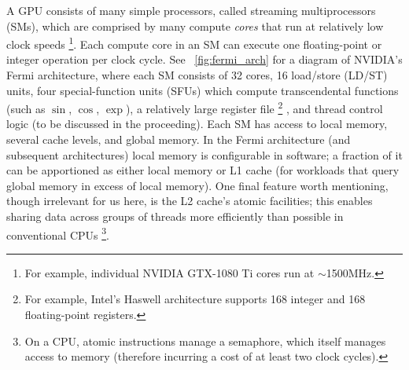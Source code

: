 A GPU consists of many simple processors, called streaming multiprocessors (SMs), which are comprised by many compute \textit{cores} that run at relatively low clock speeds%
\footnote{For example, individual NVIDIA GTX-1080 Ti cores run at $\sim$1500MHz.}.
Each compute core in an SM can execute one floating-point or integer operation per clock cycle.
See ~\cref{fig:fermi_arch} for a diagram of NVIDIA's Fermi architecture, where each SM consists of 32 cores, 16 load/store (LD/ST) units, four special-function units (SFUs) which compute transcendental functions (such as $\sin$, $\cos$, $\exp$), a relatively large register file%
\footnote{For example, Intel's Haswell architecture supports 168 integer and 168 floating-point registers.}%
, and thread control logic (to be discussed in the proceeding).
Each SM has access to local memory, several cache levels, and global memory.
In the Fermi architecture (and subsequent architectures) local memory is configurable in software;
a fraction of it can be apportioned as either local memory or L1 cache (for workloads that query global memory in excess of local memory).
One final feature worth mentioning, though irrelevant for us here, is the L2 cache's atomic  facilities;
this enables sharing data across groups of threads more efficiently than possible in conventional CPUs%
\footnote{On a CPU, atomic  instructions manage a semaphore, which itself manages access to memory (therefore incurring a cost of at least two clock cycles).}.

